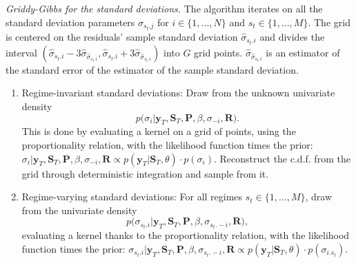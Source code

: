 \documentclass[final,3p,authoryear]{elsarticle}
\begin{document}
\begin{al}\label{al:Griddy-stdev} \textit{Griddy-Gibbs for the standard deviations.} The algorithm iterates on all the standard deviation parameters $\sigma_{s_t.j}$ for $i\in\{1,\dots,N\}$ and $s_t\in\{1,\dots,M\}$. The grid is centered on the residuals' sample standard deviation $\hat{\sigma}_{s_t.i}$ and divides the interval $(\hat{\sigma}_{s_t.i} - 3 \hat{\sigma}_{\hat{\sigma}_{s_t.i}} , \hat{\sigma}_{s_t.i} + 3 \hat{\sigma}_{\hat{\sigma}_{s_t.i}}  )$ into $G$ grid points. $\hat{\sigma}_{\hat{\sigma}_{s_t.i}}$ is an estimator of the standard error of the estimator of the sample standard deviation.
	\begin{enumerate}
		\item  Regime-invariant standard deviations: Draw from the unknown univariate density
		\begin{equation*}
		 p \bigl(\sigma_{i} \big| \mathbf{y}_T , \mathbf{S}_T , \mathbf{P}, \beta, \sigma_{-i},\mathbf{R} \bigr).
		\end{equation*}
		 This is done by evaluating a kernel on a grid of points, using the proportionality relation, with the likelihood function times the prior: $\sigma_{i}| \mathbf{y}_T , \mathbf{S}_T , \mathbf{P}, \beta, \sigma_{-i},\mathbf{R} \propto  p( \mathbf{y}_T | \mathbf{S}_T , \theta) \cdot p(\sigma_{i})$. Reconstruct the c.d.f. from the grid through deterministic integration and sample from it.
		\item Regime-varying standard deviations: For all regimes $s_t\in\{1,\dots,M\}$, draw from the univariate density
		\begin{equation*}
		 p \bigl( \sigma_{s_t.i} \big| \mathbf{y}_T , \mathbf{S}_T , \mathbf{P}, \beta, \sigma_{s_t.-i},\mathbf{R} \bigr),
		 \end{equation*}
	   evaluating a kernel thanks to the proportionality relation, with the likelihood function times the prior: $\sigma_{s_t.i} | \mathbf{y}_T , \mathbf{S}_T , \mathbf{P}, \beta, \sigma_{s_t.-i},\mathbf{R} \propto  p( \mathbf{y}_T | \mathbf{S}_T , \theta ) \cdot p(\sigma_{i.s_t})$. 
	\end{enumerate}
\end{al}   
\end{document}
